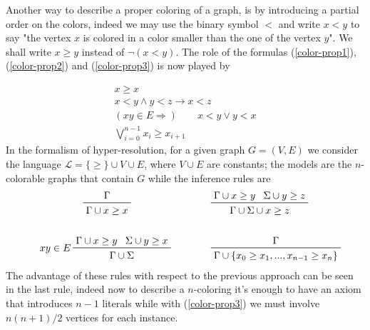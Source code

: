 \documentclass[a4paper,12pt,oneside]{book}
\let\o\vee
\let\e\wedge
\begin{document}
Another way to describe a proper coloring of a graph, is by introducing a partial order on the colors, indeed we may use the binary symbol $<$ and write $x<y$ to say "the vertex $x$ is colored in a color smaller than the one of the vertex $y$". We shall write $x\geq y $ instead of $\neg (x<y)$. The role of the formulas (\ref{color-prop1}), (\ref{color-prop2}) and (\ref{color-prop3}) is now played by 

\begin{gather}
x\geq x\\
x<y \e y<z \rightarrow x<z \\
( xy \in E \Rightarrow ) \qquad  x<y \o y<x\\
\bigvee_{i=0}^{n-1} x_i\geq x_{i+1}
\end{gather}
In the formalism of hyper-resolution, for a given graph $G=(V,E)$ we consider the language $\mathscr{L}=\{\geq\}\cup V\cup E$, where $V\cup E$ are constants; the models are the $n$-colorable graphs that contain $G$ while the inference rules are
\begin{align*}
\prftree{\Gamma}{\Gamma \cup x\geq x }\qquad \qquad\qquad
& \qquad\prftree{\Gamma\cup x\geq y}{ \Sigma\cup y\geq z }{\Gamma\cup\Sigma\cup x\geq z } \\
\,&\,\\
\prftree[l]{$\quad xy \in E $}{\Gamma \cup  x\geq y }{\Sigma \cup  y\geq x }
{ \Gamma\cup\Sigma} \qquad &\qquad \prftree{\Gamma}
{\Gamma\cup\{x_0\geq x_1 ,..., x_{n-1}\geq x_n \}}
\end{align*}
The advantage of these rules with respect to the previous approach can be seen in the last rule, indeed now to describe a $n$-coloring it's enough to have an axiom that introduces $n-1$ literals while with (\ref{color-prop3}) we must involve $n(n+1)/2$ vertices for each instance.
\end{document}
